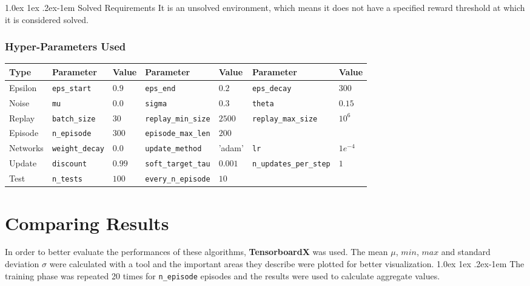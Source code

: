 \documentclass[a4paper, 11pt]{article}
\makeatletter
\renewcommand{\paragraph}{%
	\@startsection{paragraph}{4}%
	{\z@}{1.0ex \@plus 1ex \@minus .2ex}{-1em}%
	{\normalfont\normalsize\bfseries}%
}
\makeatother
\begin{document}
	\paragraph{Solved Requirements}
	It is an unsolved environment, which means it does not have a specified reward threshold at which it is considered solved.
	
	\subsubsection{Hyper-Parameters Used}
	\begin{table}[!h]
		\centering
		\label{mountain_action}
		\begin{tabular}{@{}lllllll@{}}
			\toprule
			Type			&Parameter			& Value	& Parameter				& Value  & Parameter			&  Value 	\\		\midrule
			Epsilon & \texttt{eps\_start}	& $0.9$	&  \texttt{eps\_end}	& $0.2$ & \texttt{eps\_decay} 	& $300$		\\
			Noise & \texttt{mu}	& $0.0$	&  \texttt{sigma}	& $0.3$ & \texttt{theta} 	& $0.15$		\\
			Replay & \texttt{batch\_size}	& $30$	&  \texttt{replay\_min\_size}	& $2500$ & \texttt{replay\_max\_size} 	& $10^6$		\\
			Episode & \texttt{n\_episode}	& $300$	&  \texttt{episode\_max\_len}	& $200$ & 	& 		\\
			Networks & \texttt{weight\_decay}	& $0.0$	&  \texttt{update\_method}	& 'adam' & \texttt{lr} 	& $1e^{-4}$		\\
			Update & \texttt{discount}	& $0.99$	&  \texttt{soft\_target\_tau}	& $0.001$ & \texttt{n\_updates\_per\_step} 	& $1$		\\
			Test & \texttt{n\_tests}	& $100$	&  \texttt{every\_n\_episode}	& $10$ &  	& 	\\
			\bottomrule
		\end{tabular}
	\end{table}
	\newpage
	\section{Comparing Results} \label{results}
	
	In order to better evaluate the performances of these algorithms, \textbf{TensorboardX} was used. 
	The mean $\mu$, $min$,  $max$ and standard deviation $\sigma$ were calculated with a tool and the important areas they describe were plotted for better visualization.
	\paragraph{\color{train_color_2}{Training Phase}} The training phase was repeated 20 times for \texttt{n\_episode} episodes and the results were used to calculate aggregate values.
\end{document}
